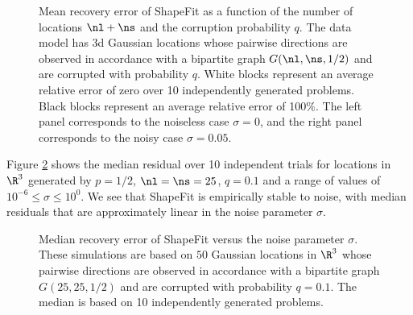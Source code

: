 \begin{figure} 
\begin{center}
{\large

}
\end{center}
\caption{Mean recovery error of ShapeFit as a function of the number of locations $\nl + \ns$ and the corruption probability $q$.  The data model has 3d Gaussian locations whose pairwise directions are observed in accordance with a bipartite \erdosrenyi graph $G(\nl, \ns, 1/2)$ and are corrupted with probability $q$.   White blocks represent an average relative error of zero over 10 independently generated problems.  Black blocks represent an average relative error of 100\%.   The left panel corresponds to the noiseless case $\sigma = 0$, and the right panel corresponds to the noisy case $\sigma = 0.05$.  
}
\label{fig-phase-transition}
\end{figure}

Figure \ref{fig-robustness} shows the median residual over 10 independent trials for locations in $\R^3$ generated by $p = 1/2$, $\nl = \ns = 25$, $q= 0.1$ and a range of values of $10^{-6} \leq \sigma \leq 10^0$.  We see that ShapeFit is empirically stable to noise, with median residuals that are approximately linear in the noise parameter $\sigma$.
 
\begin{figure}
\begin{center}
{\large

}
\end{center}
\caption{
Median recovery error of ShapeFit versus the noise parameter $\sigma$.  These simulations are based on $50$  Gaussian locations in $\R^3$ whose pairwise directions are observed in accordance with a bipartite \erdosrenyi graph $G(25, 25,1/2)$ and are corrupted with probability $q=0.1$.  The median is based on 10 independently generated problems.
}
 \label{fig-robustness}
\end{figure}

